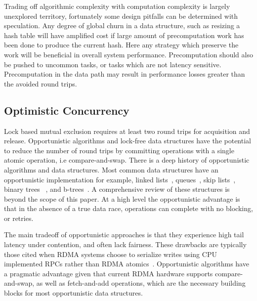 Trading off algorithmic complexity with computation complexity is largely
unexplored territory, fortunately some design pitfalls can be determined with
speculation. Any degree of global churn in a data structure, such as resizing a
hash table will have amplified cost if large amount of precomputation work has
been done to produce the current hash. Here any strategy which preserve the work
will be beneficial in overall system performance. Precomputation should also be
pushed to uncommon tasks, or tasks which are not latency sensitive.
Precomputation in the data path may result in performance losses greater than
the avoided round trips.

\subsection{Optimistic Concurrency} 

Lock based mutual exclusion requires at least two round trips for acquisition
and release. Opportunistic algorithms and lock-free data structures have the
potential to reduce the number of round trips by committing operations with a
single atomic operation, i.e compare-and-swap. There is a deep history of
opportunistic algorithms and data structures. Most common data structures have
an opportunistic implementation for example, linked
lists~\cite{linked-list-cas}, queues~\cite{simple-fast}, skip
lists~\cite{lock-free-skip}, binary trees ~\cite{non-block-binary}, and
b-trees~\cite{read-concur-btree,lock-free-btree}. A comprehensive review of
these structures is beyond the scope of this paper. At a high level the
opportunistic advantage is that in the absence of a true data race, operations
can complete with no blocking, or retries.

The main tradeoff of opportunistic approaches is that they experience high tail
latency under contention, and often lack fairness. These drawbacks are typically
those cited when RDMA systems choose to serialize writes using CPU implemented
RPCs rather than RDMA atomics~\cite{pilaf, cell, herd}. Opportunistic algorithms
have a pragmatic advantage given that current RDMA hardware supports
compare-and-swap, as well as fetch-and-add operations, which are the necessary
building blocks for most opportunistic data structures.

